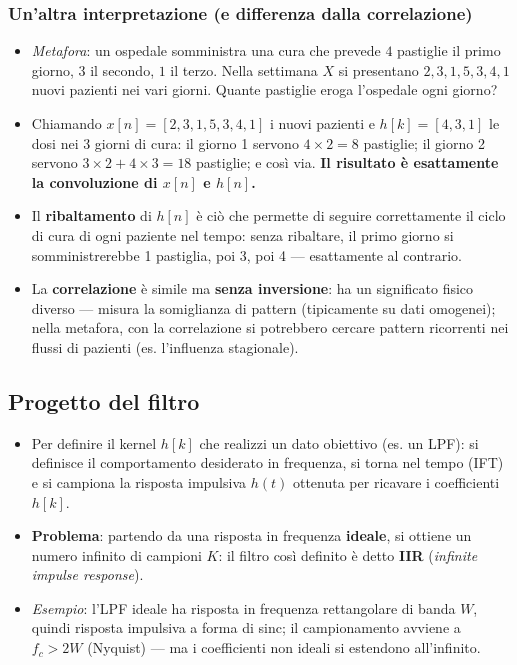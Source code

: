 \documentclass[12pt, a4paper]{article}
\begin{document}
\subsubsection{Un'altra interpretazione (e differenza dalla correlazione)}
\begin{itemize}
    \item \textit{Metafora}: un ospedale somministra una cura che prevede $4$ pastiglie il primo giorno, $3$ il secondo, $1$ il terzo. Nella settimana $X$ si presentano $2,3,1,5,3,4,1$ nuovi pazienti nei vari giorni. Quante pastiglie eroga l'ospedale ogni giorno?
    \item Chiamando $x[n]=[2,3,1,5,3,4,1]$ i nuovi pazienti e $h[k]=[4,3,1]$ le dosi nei 3 giorni di cura: il giorno 1 servono $4\times2=8$ pastiglie; il giorno 2 servono $3\times2+4\times3=18$ pastiglie; e così via. \textbf{Il risultato è esattamente la convoluzione di $x[n]$ e $h[n]$.}
    \item Il \textbf{ribaltamento} di $h[n]$ è ciò che permette di seguire correttamente il ciclo di cura di ogni paziente nel tempo: senza ribaltare, il primo giorno si somministrerebbe 1 pastiglia, poi 3, poi 4 — esattamente al contrario.
    \item La \textbf{correlazione} è simile ma \textbf{senza inversione}: ha un significato fisico diverso — misura la somiglianza di pattern (tipicamente su dati omogenei); nella metafora, con la correlazione si potrebbero cercare pattern ricorrenti nei flussi di pazienti (es. l'influenza stagionale).
\end{itemize}

\subsection{Progetto del filtro}
\begin{itemize}
    \item Per definire il kernel $h[k]$ che realizzi un dato obiettivo (es. un LPF): si definisce il comportamento desiderato in frequenza, si torna nel tempo (IFT) e si campiona la risposta impulsiva $h(t)$ ottenuta per ricavare i coefficienti $h[k]$.
    \item \textbf{Problema}: partendo da una risposta in frequenza \textbf{ideale}, si ottiene un numero infinito di campioni $K$: il filtro così definito è detto \textbf{IIR} (\textit{infinite impulse response}).
    \item \textit{Esempio}: l'LPF ideale ha risposta in frequenza rettangolare di banda $W$, quindi risposta impulsiva a forma di sinc; il campionamento avviene a $f_c>2W$ (Nyquist) — ma i coefficienti non ideali si estendono all'infinito.
\end{itemize}
\end{document}
